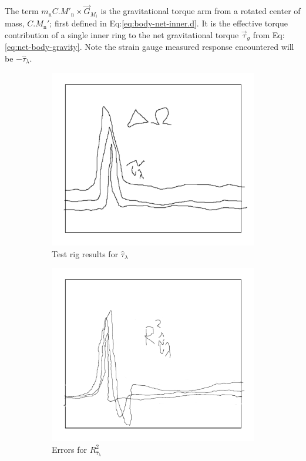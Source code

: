 The term $m_\text{n}C.M'_{\text{n}}\times\vec{G}_{M_i}$ is the gravitational torque arm from a rotated center of mass, $C.M_{\text{n}}'$; first defined in Eq:\ref{eq:body-net-inner.d}. It is the effective torque contribution of a single inner ring to the net gravitational torque $\vec{\tau}_g$ from Eq:\ref{eq:net-body-gravity}. Note the strain gauge measured response encountered will be $-\hat{\tau}_\lambda$.
\par
\begin{figure}[hbtp]
\centering
\begin{subfigure}{0.49\textwidth}
\centering
\includegraphics[width=\textwidth]{graphs/tau-lambda}
\caption{Test rig results for $\hat{\tau}_\lambda$}
\label{fig:tau-lambda}
\end{subfigure}
\begin{subfigure}{0.49\textwidth}
\centering
\includegraphics[width=\textwidth]{graphs/tau-lambda-r}
\caption{Errors for $R^2_{\hat{\tau}_\lambda}$}
\label{fig:tau-lambda-r}
\end{subfigure}
\caption{}
\end{figure}
